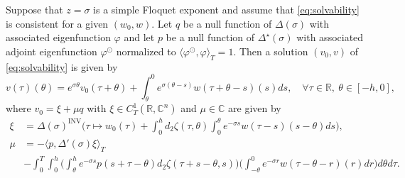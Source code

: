 \documentclass[english]{myarticle}
\DeclareMathOperator{\inv}{INV}
\begin{document}
\begin{sloppypar}
\begin{proposition} \label{prop:borderedinversemu}
Suppose that $z = \sigma$ is a simple Floquet exponent and assume that \eqref{eq:solvability} is consistent for a given $(w_0,w)$. Let $q$ be a null function of $\Delta(\sigma)$ with associated eigenfunction $\varphi$ and let $p$ be a null function of $\Delta^\star(\sigma)$ with associated adjoint eigenfunction $\varphi^\odot$ normalized to $\langle \varphi^\odot,\varphi \rangle_T = 1$. Then a solution $(v_0,v)$ of \eqref{eq:solvability} is given by
\begin{equation} \label{eq:solvabilityv2}
    v(\tau)(\theta) = e^{\sigma \theta} v_0(\tau + \theta) + \int_\theta^0 e^{\sigma(\theta -s)} w(\tau + \theta - s)(s) ds, \quad \forall \tau \in \mathbb{R}, \ \theta \in [-h,0],
\end{equation}
where $v_0 = \xi + \mu q$ with $\xi \in C_T^1(\mathbb{R},\mathbb{C}^n)$ and $\mu \in \mathbb{C}$ are given by
\begin{align*}
    \xi &= \Delta(\sigma)^{\inv}\bigg( \tau \mapsto w_0(\tau) + \int_0^h d_2 \zeta(\tau,\theta)\int_{0}^{\theta} e^{-\sigma s} w(\tau - s)(s-\theta) ds \bigg), \\
    \mu &= - \langle p,\Delta'(\sigma)\xi \rangle_T \\
    &- \int_0^T \int_0^h \bigg(\int_\theta^h e^{-\sigma s}p(s+\tau-\theta) d_2\zeta(\tau + s - \theta,s) \bigg) \bigg(\int_{- \theta}^0 e^{-\sigma r} w(\tau - \theta - r)(r) dr \bigg) d\theta d\tau.
\end{align*}


\end{proposition}
\end{sloppypar}
\end{document}
